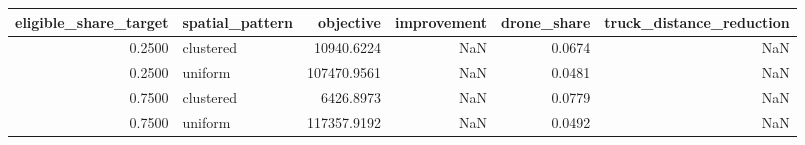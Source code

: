 \begin{tabular}{rlrrrr}
\toprule
eligible_share_target & spatial_pattern & objective & improvement & drone_share & truck_distance_reduction \\
\midrule
0.2500 & clustered & 10940.6224 & NaN & 0.0674 & NaN \\
0.2500 & uniform & 107470.9561 & NaN & 0.0481 & NaN \\
0.7500 & clustered & 6426.8973 & NaN & 0.0779 & NaN \\
0.7500 & uniform & 117357.9192 & NaN & 0.0492 & NaN \\
\bottomrule
\end{tabular}
